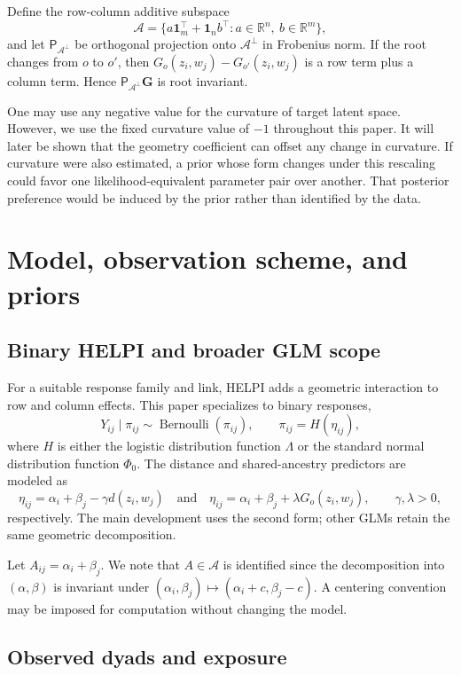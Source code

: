 \documentclass[
  12pt]{article}
\theoremstyle{definition}
\theoremstyle{plain}
\newcommand{\R}{\mathbb R}
\newcommand{\Bern}{\operatorname{Bernoulli}}
\newcommand{\calA}{\mathcal A}
\newcommand{\one}{\mathbf 1}
\newcommand{\projA}{\mathsf P_{\calA^\perp}}
\newcommand{\bG}{\mathbf G}
\begin{document}
Define the row-column additive subspace
\[
\calA=\{a\one_m^\top+\one_n b^\top:a\in\R^n,\ b\in\R^m\},
\]
and let $\projA$ be orthogonal projection onto $\calA^\perp$ in Frobenius norm. If the root changes from $o$ to $o'$, then $G_o(z_i,w_j)-G_{o'}(z_i,w_j)$ is a row term plus a column term. Hence $\projA\bG$ is root invariant.

One may use any negative value for the curvature of target latent space. However, we use the fixed curvature value of $-1$ throughout this paper. It will later be shown that the geometry coefficient can offset any change in curvature. If curvature were also estimated, a prior whose form changes under this rescaling could favor one likelihood-equivalent parameter pair over another. That posterior preference would be induced by the prior rather than identified by the data.

\section{Model, observation scheme, and priors}\label{sec:model}

\subsection{Binary HELPI and broader GLM scope}

For a suitable response family and link, HELPI adds a geometric interaction to row and column effects. This paper specializes to binary responses,
\[
Y_{ij}\mid\pi_{ij}\sim\Bern(\pi_{ij}),
\qquad \pi_{ij}=H(\eta_{ij}),
\]
where $H$ is either the logistic distribution function $\Lambda$ or the standard normal distribution function $\Phi_0$. The distance and shared-ancestry predictors are modeled as 
\[
\eta_{ij}=\alpha_i+\beta_j-\gamma d(z_i,w_j)
\quad\text{and}\quad
\eta_{ij}=\alpha_i+\beta_j+\lambda G_o(z_i,w_j),\qquad \gamma,\lambda>0,
\]
respectively.  The main development uses the second form; other GLMs retain the same geometric decomposition.

Let $A_{ij}=\alpha_i+\beta_j$. We note that $A\in\calA$ is identified since the decomposition into $(\alpha,\beta)$ is invariant under $(\alpha_i,\beta_j)\mapsto(\alpha_i+c,\beta_j-c)$. A centering convention may be imposed for computation without changing the model.



\subsection{Observed dyads and exposure}
\end{document}
